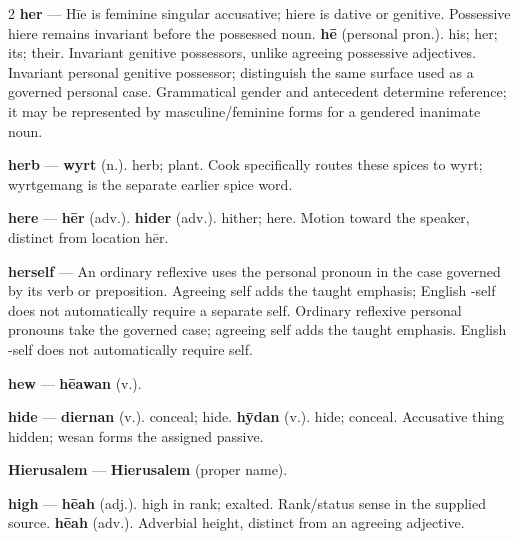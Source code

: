 \begin{multicols}{2}
\textbf{her} — Hīe is feminine singular accusative; hiere is dative or genitive. Possessive hiere remains invariant before the possessed noun. \textbf{hē} (personal pron.). his; her; its; their. Invariant genitive possessors, unlike agreeing possessive adjectives. Invariant personal genitive possessor; distinguish the same surface used as a governed personal case. Grammatical gender and antecedent determine reference; it may be represented by masculine/feminine forms for a gendered inanimate noun.\par
\textbf{herb} — \textbf{wyrt} (n.). herb; plant. Cook specifically routes these spices to wyrt; wyrtgemang is the separate earlier spice word.\par
\textbf{here} — \textbf{hēr} (adv.).  \textbf{hider} (adv.). hither; here. Motion toward the speaker, distinct from location hēr.\par
\textbf{herself} — An ordinary reflexive uses the personal pronoun in the case governed by its verb or preposition. Agreeing self adds the taught emphasis; English -self does not automatically require a separate self. Ordinary reflexive personal pronouns take the governed case; agreeing self adds the taught emphasis. English -self does not automatically require self.\par
\textbf{hew} — \textbf{hēawan} (v.).\par
\textbf{hide} — \textbf{diernan} (v.). conceal; hide. \textbf{hȳdan} (v.). hide; conceal. Accusative thing hidden; wesan forms the assigned passive.\par
\textbf{Hierusalem} — \textbf{Hierusalem} (proper name).\par
\textbf{high} — \textbf{hēah} (adj.). high in rank; exalted. Rank/status sense in the supplied source. \textbf{hēah} (adv.). Adverbial height, distinct from an agreeing adjective.\par

\end{multicols}
